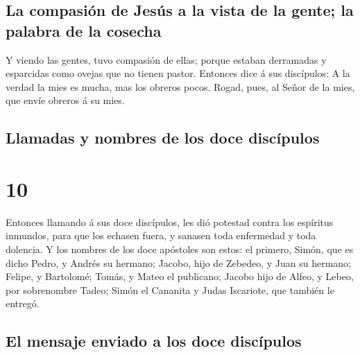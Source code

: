 \hypertarget{la-compasiuxf3n-de-jesuxfas-a-la-vista-de-la-gente-la-palabra-de-la-cosecha}{%
\subsection{La compasión de Jesús a la vista de la gente; la palabra de
la
cosecha}\label{la-compasiuxf3n-de-jesuxfas-a-la-vista-de-la-gente-la-palabra-de-la-cosecha}}

 Y viendo las gentes, tuvo compasión de ellas; porque
estaban derramadas y esparcidas como ovejas que no tienen pastor.
 Entonces dice á sus discípulos: A la verdad la mies es
mucha, mas los obreros pocos.  Rogad, pues, al Señor de
la mies, que envíe obreros á su mies.

\hypertarget{llamadas-y-nombres-de-los-doce-discuxedpulos}{%
\subsection{Llamadas y nombres de los doce
discípulos}\label{llamadas-y-nombres-de-los-doce-discuxedpulos}}

\hypertarget{section-40-10}{%
\section{10}\label{section-40-10}}

 Entonces llamando á sus doce discípulos, les dió potestad
contra los espíritus inmundos, para que los echasen fuera, y sanasen
toda enfermedad y toda dolencia.  Y los nombres de los
doce apóstoles son estos: el primero, Simón, que es dicho Pedro, y
Andrés su hermano; Jacobo, hijo de Zebedeo, y Juan su hermano;
 Felipe, y Bartolomé; Tomás, y Mateo el publicano; Jacobo
hijo de Alfeo, y Lebeo, por sobrenombre Tadeo;  Simón el
Cananita y Judas Iscariote, que también le entregó.

\hypertarget{el-mensaje-enviado-a-los-doce-discuxedpulos}{%
\subsection{El mensaje enviado a los doce
discípulos}\label{el-mensaje-enviado-a-los-doce-discuxedpulos}}

